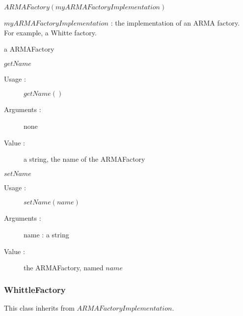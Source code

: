\begin{description}

\item[Usage :] \rule{0pt}{1em}
  \begin{description}  
  \item $ARMAFactory(myARMAFactoryImplementation)$
  \end{description}
  \bigskip

\item[Arguments :] $myARMAFactoryImplementation$ : the implementation of an ARMA factory. For example, a Whitte factory.

  \bigskip

\item[Value :] a ARMAFactory
  \bigskip

\item[Some methods :]  \rule{0pt}{1em}

  \begin{description}

  \item $getName$
    \begin{description}
    \item[Usage :] $getName()$
    \item[Arguments :] none
    \item[Value :] a string, the name of the ARMAFactory
    \end{description}
    \bigskip

  \item $setName$
    \begin{description}
    \item[Usage :] $setName(name)$
    \item[Arguments :] name : a string
    \item[Value :] the ARMAFactory, named $name$
    \end{description}
    \bigskip


  \end{description}

\end{description}


\subsubsection{WhittleFactory}

This class inherits from $ARMAFactoryImplementation$.\\

